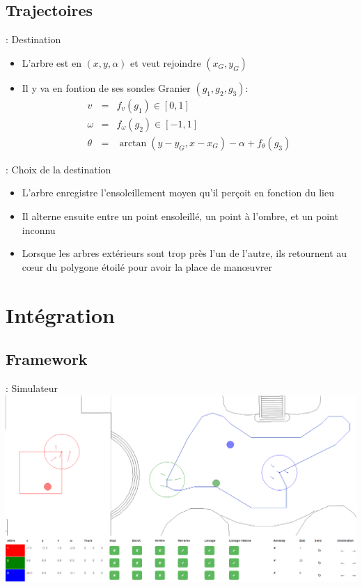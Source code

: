 \documentclass[12pt]{beamer}
\begin{document}
        \subsection{Trajectoires}
            \begin{frame}{\subsecname: Destination}
                \begin{itemize}
                    \item L’arbre est en $(x, y, \alpha)$ et veut rejoindre $(x_G, y_G)$
                    \item Il y va en fontion de ses sondes Granier $(g_1, g_2, g_3)$:
                        \begin{eqnarray*}
                            v &=& f_v(g_1) \in [0, 1] \\
                            \omega &=& f_\omega(g_2) \in [-1, 1] \\
                            \theta &=& \arctan(y - y_G, x - x_G) - \alpha + f_\theta(g_3)
                        \end{eqnarray*}
                \end{itemize}
            \end{frame}
            \begin{frame}{\subsecname: Choix de la destination}
                \begin{itemize}
                    \item L’arbre enregistre l’ensoleillement moyen qu’il perçoit en fonction du lieu
                    \item Il alterne ensuite entre un point ensoleillé, un point à l’ombre, et un point inconnu
                    \item Lorsque les arbres extérieurs sont trop près l’un de l’autre, ils retournent au cœur du polygone étoilé pour avoir la place de manœuvrer
                \end{itemize}
            \end{frame}

    \section{Intégration}
        \subsection{Framework}
            \begin{frame}{\subsecname: Simulateur}
                \includegraphics[width=\linewidth]{img/simu.png}
            \end{frame}
\end{document}
